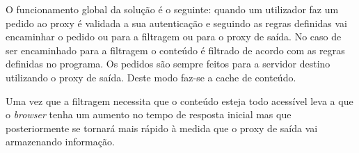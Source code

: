 O funcionamento global da solução é o seguinte: quando um utilizador faz um pedido ao proxy é validada a sua autenticação e seguindo as regras definidas vai encaminhar o pedido ou para a filtragem ou para o proxy de saída.
No caso de ser encaminhado para a filtragem o conteúdo é filtrado de acordo com as regras definidas no programa.
Os pedidos são sempre feitos para a servidor destino utilizando o proxy de saída.
Deste modo faz-se a cache de conteúdo.

Uma vez que a filtragem necessita que o conteúdo esteja todo acessível leva a que o \emph{browser} tenha um aumento no tempo de resposta inicial mas que posteriormente se tornará mais rápido à medida que o proxy de saída vai armazenando informação.


